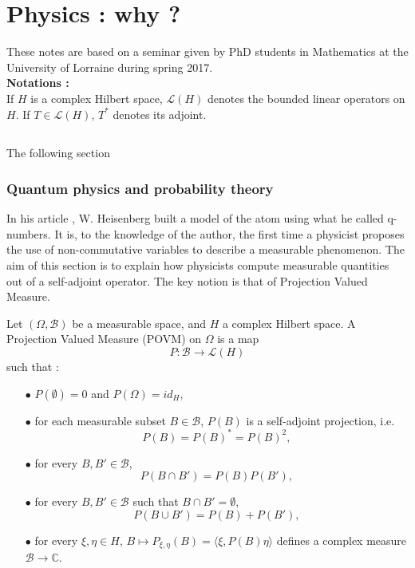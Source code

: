 \chapter{Physics : why ?}
These notes are based on a seminar given by PhD students in Mathematics at the University of Lorraine during spring 2017. \\

\textbf{Notations :} \\
If $H$ is a complex Hilbert space, $\mathcal L(H)$ denotes the bounded linear operators on $H$. If $T\in\mathcal L(H)$, $T^*$ denotes its adjoint. 

\section{}

The following section 
\subsection{Quantum physics and probability theory}

In his article \cite{Heisenberg}, W. Heisenberg built a model of the atom using what he called q-numbers. It is, to the knowledge of the author, the first time a physicist proposes the use of non-commutative variables to describe a measurable phenomenon. The aim of this section is to explain how physicists compute measurable quantities out of a self-adjoint operator. The key notion is that of Projection Valued Measure.

\begin{definition}
Let $(\Omega,\mathcal B)$ be a measurable space, and $H$ a complex Hilbert space. A Projection Valued Measure (POVM) on $\Omega$ is a map
\[P :\mathcal B \rightarrow \mathcal L(H) \]
such that :
\begin{itemize}
\item[$\bullet$] $P(\emptyset) = 0$ and $P(\Omega)= id_H$,
\item[$\bullet$] for each measurable subset $B\in \mathcal B$, $ P(B)$ is a self-adjoint projection, i.e. \[ P(B)=P(B)^*=P(B)^2,\] 
\item[$\bullet$] for every $B,B'\in \mathcal B$, \[P(B\cap B') = P(B)P(B'),\]
\item[$\bullet$] for every $B,B'\in \mathcal B$ such that $B\cap B' = \emptyset$, \[P(B\cup B') = P(B)+P(B'),\]
\item[$\bullet$] for every $\xi,\eta\in H$, $B\mapsto P_{\xi,\eta}(B) = \langle \xi, P(B)\eta\rangle$ defines a complex measure $\mathcal B \rightarrow \mathbb C$.
\end{itemize}
\end{definition}

